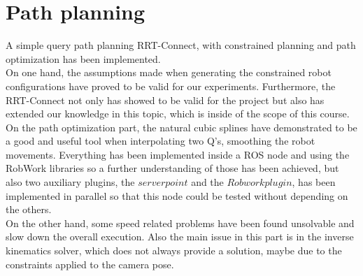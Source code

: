 \section{Path planning}
A simple query path planning RRT-Connect, with constrained planning and path optimization has been implemented. \\
On one hand, the assumptions made when generating the constrained robot configurations have proved to be valid for our experiments. 
Furthermore, the RRT-Connect not only has showed to be valid for the project but also has extended our knowledge in this topic, which is inside of the scope of this course.
On the path optimization part, the natural cubic splines have demonstrated to be a good and useful tool when interpolating two Q's, smoothing the robot movements. Everything has been implemented inside a ROS node and using the RobWork libraries so a further understanding of those has been achieved, but also two auxiliary plugins, the $server point$ and the $Robwork plugin$, has been implemented in parallel so that this node could be tested without depending on the others.\\
On the other hand, some speed related problems have been found unsolvable and slow down the overall execution. Also the main issue in this part is in the inverse kinematics solver, which does not always provide a solution, maybe due to the constraints applied to the camera pose.

